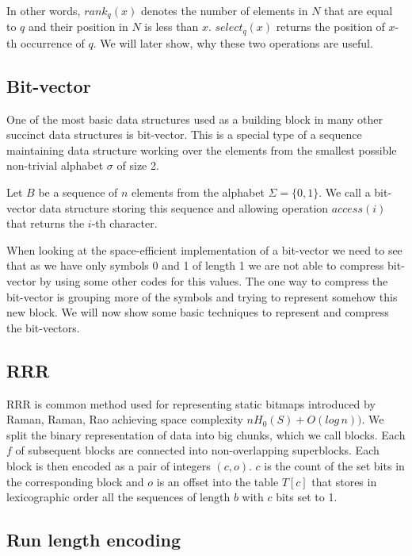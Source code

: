In other words, $rank_q(x)$ denotes the number of elements in $N$ that are equal to $q$ and their position in $N$ is less than $x$. $select_q(x)$ returns the position of $x$-th occurrence of $q$. We will later show, why these two operations are useful.

\subsection{Bit-vector}

One of the most basic data structures used as a building block in many other succinct data structures is bit-vector. This is a special type of a sequence maintaining data structure working over the elements from the smallest possible non-trivial alphabet $\sigma$ of size 2.

\begin{theorem}
Let $B$ be a sequence of $n$ elements from the alphabet $\Sigma = \{0, 1\}$. We call a bit-vector data structure storing this sequence
and allowing operation $access(i)$ that returns the $i$-th character.
\end{theorem}

When looking at the space-efficient implementation of a bit-vector we need to see that as we have only symbols 0 and 1 of length 1 we are not able to compress bit-vector by using some other codes for this values. The one way to compress the bit-vector is grouping more of the symbols and trying to represent somehow this new block. We will now show some basic techniques to represent and compress the bit-vectors. 

\subsection{RRR}

RRR is common method used for representing static bitmaps introduced by Raman, Raman, Rao \cite{raman2007succinct} achieving space complexity $nH_0(S) + O(log\,n))$. We split the binary representation of data into big chunks, which we call blocks.
Each $f$ of subsequent blocks are connected into non-overlapping superblocks. Each block is then encoded as a pair of integers $(c, o)$. $c$
is the count of the set bits in the corresponding block and $o$ is an offset into the table $T[c]$ that stores in lexicographic order all the sequences of
length $b$ with $c$ bits set to 1.

\subsection{Run length encoding}

